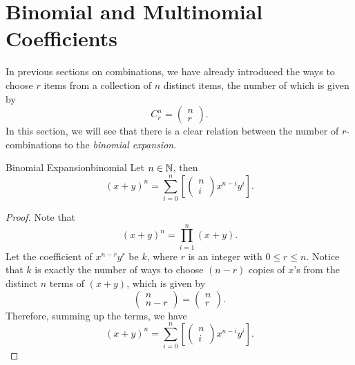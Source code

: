 \documentclass[math]{amznotes}
\theoremstyle{remark}
\newcommand{\0}{\mathbf{0}}
\newcommand{\1}{\mathbf{1}}
\begin{document}
\section{Binomial and Multinomial Coefficients}
In previous sections on combinations, we have already introduced the ways to choose $r$ items from a collection of $n$ distinct items, the number of which is given by
\begin{displaymath}
    C^n_r = \begin{pmatrix}
        n \\
        r
    \end{pmatrix}.
\end{displaymath} 
In this section, we will see that there is a clear relation between the number of $r$-combinations to the \textit{binomial expansion}.
\begin{thmbox}{Binomial Expansion}{binomial}
    Let $n \in \mathbb{N}$, then
    \begin{equation*}
        (x + y)^n = \sum_{i = 0}^{n}\left[\begin{pmatrix}
            n \\
            i
        \end{pmatrix}x^{n - i}y^i\right].
    \end{equation*}
    \tcblower   
    \begin{proof}
        Note that 
        \begin{equation*}
            (x + y)^n = \prod_{i = 1}^{n}(x + y).
        \end{equation*}
        Let the coefficient of $x^{n - r}y^r$ be $k$, where $r$ is an integer with $0 \leq r \leq n$. Notice that $k$ is exactly the number of ways to choose $(n - r)$ copies of $x$'s from the distinct $n$ terms of $(x + y)$, which is given by
        \begin{equation*}
            \begin{pmatrix}
                n \\
                n - r
            \end{pmatrix} = \begin{pmatrix}
                n \\
                r
            \end{pmatrix}.
        \end{equation*}
        Therefore, summing up the terms, we have
        \begin{equation*}
            (x + y)^n = \sum_{i = 0}^{n}\left[\begin{pmatrix}
                n \\
                i
            \end{pmatrix}x^{n - i}y^i\right].
        \end{equation*}
    \end{proof}
\end{thmbox}
\end{document}
